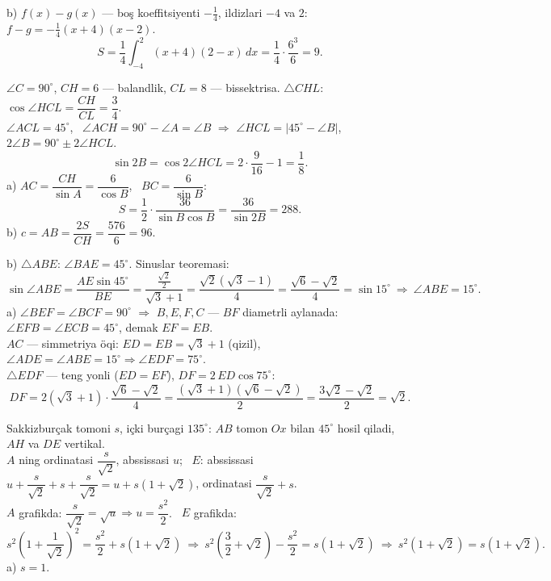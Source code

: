 b) $f(x)-g(x)$ — boş koeffitsiyenti $-\frac14$, ildizlari $-4$ va $2$: \ $f-g=-\frac14(x+4)(x-2)$.
\[S=\frac14\int_{-4}^2(x+4)(2-x)\,dx=\frac14\cdot\frac{6^3}6=9.\]

\newpage
{}
$\angle C=90^\circ$, $CH=6$ — balandlik, $CL=8$ — bissektrisa. $\triangle CHL$: $\cos\angle HCL=\dfrac{CH}{CL}=\dfrac34$.\\
$\angle ACL=45^\circ$, \ $\angle ACH=90^\circ-\angle A=\angle B$ $\Rightarrow$ $\angle HCL=|45^\circ-\angle B|$, \ $2\angle B=90^\circ\pm2\angle HCL$.
\[\sin2B=\cos2\angle HCL=2\cdot\frac9{16}-1=\frac18.\]
a) $AC=\dfrac{CH}{\sin A}=\dfrac6{\cos B}$, \ $BC=\dfrac6{\sin B}$:
\[S=\frac12\cdot\frac{36}{\sin B\cos B}=\frac{36}{\sin2B}=288.\]
b) $c=AB=\dfrac{2S}{CH}=\dfrac{576}6=96$.

\newpage
{}
b) $\triangle ABE$: $\angle BAE=45^\circ$. Sinuslar teoremasi:
\[\sin\angle ABE=\frac{AE\sin45^\circ}{BE}=\frac{\frac{\sqrt2}2}{\sqrt3+1}=\frac{\sqrt2(\sqrt3-1)}4=\frac{\sqrt6-\sqrt2}4=\sin15^\circ\ \Rightarrow\ \angle ABE=15^\circ.\]
a) $\angle BEF=\angle BCF=90^\circ$ $\Rightarrow$ $B,E,F,C$ — $BF$ diametrli aylanada: $\angle EFB=\angle ECB=45^\circ$, demak $EF=EB$.\\
$AC$ — simmetriya öqi: $ED=EB=\sqrt3+1$ (\textcolor{aux}{qizil}), \ $\angle ADE=\angle ABE=15^\circ\Rightarrow\angle EDF=75^\circ$.\\
$\triangle EDF$ — teng yonli ($ED=EF$), $DF=2\,ED\cos75^\circ$:
\[DF=2(\sqrt3+1)\cdot\frac{\sqrt6-\sqrt2}4=\frac{(\sqrt3+1)(\sqrt6-\sqrt2)}2=\frac{3\sqrt2-\sqrt2}2=\sqrt2.\]

\newpage
{}
Sakkizburçak tomoni $s$, içki burçagi $135^\circ$: $AB$ tomon $Ox$ bilan $45^\circ$ hosil qiladi, $AH$ va $DE$ vertikal.\\
$A$ ning ordinatasi $\dfrac s{\sqrt2}$, abssissasi $u$; \ $E$: abssissasi $u+\dfrac s{\sqrt2}+s+\dfrac s{\sqrt2}=u+s(1+\sqrt2)$, ordinatasi $\dfrac s{\sqrt2}+s$.\\
$A$ grafikda: $\dfrac s{\sqrt2}=\sqrt u\Rightarrow u=\dfrac{s^2}2$. \ $E$ grafikda:
\[s^2\left(1+\frac1{\sqrt2}\right)^2=\frac{s^2}2+s(1+\sqrt2)\ \Rightarrow\ s^2\left(\frac32+\sqrt2\right)-\frac{s^2}2=s(1+\sqrt2)\ \Rightarrow\ s^2(1+\sqrt2)=s(1+\sqrt2).\]
a) $s=1$.

